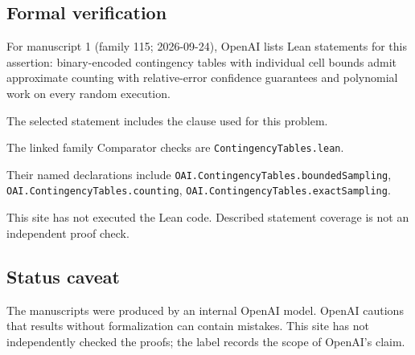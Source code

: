 \documentclass[11pt]{article}
\begin{document}
\subsection{Formal verification}
For manuscript 1 (family 115; 2026-09-24), OpenAI lists Lean statements for this assertion: binary-encoded contingency tables with individual cell bounds admit approximate counting with relative-error confidence guarantees and polynomial work on every random execution.

The selected statement includes the clause used for this problem.

The linked family Comparator checks are \texttt{ContingencyTables.lean}.

Their named declarations include \texttt{OAI.ContingencyTables.boundedSampling}, \texttt{OAI.ContingencyTables.counting}, \texttt{OAI.ContingencyTables.exactSampling}.

This site has not executed the Lean code. Described statement coverage is not an independent proof check.

\subsection{Status caveat}
The manuscripts were produced by an internal OpenAI model. OpenAI cautions that results without formalization can contain mistakes. This site has not independently checked the proofs; the label records the scope of OpenAI's claim.
\end{document}
